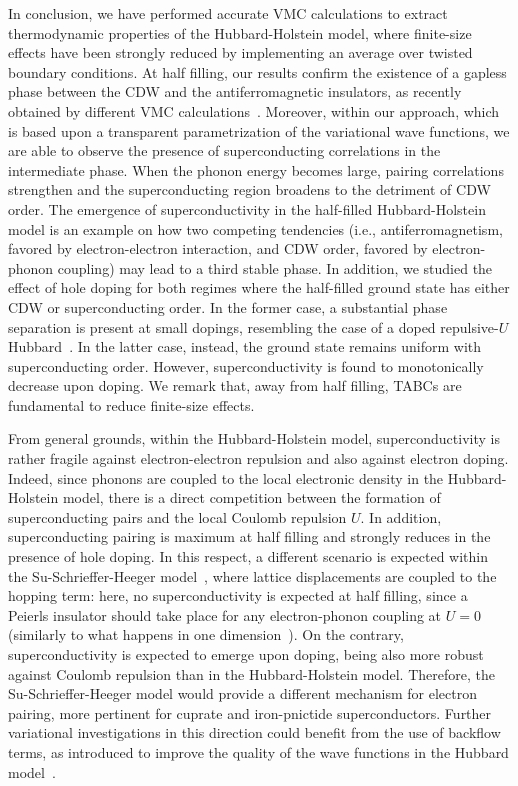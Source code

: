 \documentclass[aps,superscriptaddress,amsmath,amssymb,twocolumn,showpacs,floatfix,english]{revtex4}
\begin{document}
In conclusion, we have performed accurate VMC calculations to extract thermodynamic properties of the Hubbard-Holstein model, where 
finite-size effects have been strongly reduced by implementing an average over twisted boundary conditions. At half filling, our results 
confirm the existence of a gapless phase between the CDW and the antiferromagnetic insulators, as recently obtained by different VMC 
calculations~\cite{Ohgoe2017}. Moreover, within our approach, which is based upon a transparent parametrization of the variational wave 
functions, we are able to observe the presence of superconducting correlations in the intermediate phase. When the phonon energy becomes 
large, pairing correlations strengthen and the superconducting region broadens to the detriment of CDW order. The emergence of 
superconductivity in the half-filled Hubbard-Holstein model is an example on how two competing tendencies (i.e., antiferromagnetism, 
favored by electron-electron interaction, and CDW order, favored by electron-phonon coupling) may lead to a third stable phase. In addition, 
we studied the effect of hole doping for both regimes where the half-filled ground state has either CDW or superconducting order. In the 
former case, a substantial phase separation is present at small dopings, resembling the case of a doped repulsive-$U$ 
Hubbard~\cite{Macridin2006b,Aichhorn2007,Chang2008,Misawa2014,Sorella2015,Tocchio2016,Simkovic2017}. In the latter case, instead, the 
ground state remains uniform with superconducting order. However, superconductivity is found to monotonically decrease upon doping. 
We remark that, away from half filling, TABCs are fundamental to reduce finite-size effects.

From general grounds, within the Hubbard-Holstein model, superconductivity is rather fragile against electron-electron repulsion and also
against electron doping. Indeed, since phonons are coupled to the local electronic density in the Hubbard-Holstein model, there is a direct 
competition between the formation of superconducting pairs and the local Coulomb repulsion $U$. In addition, superconducting pairing
is maximum at half filling and strongly reduces in the presence of hole doping. In this respect, a different scenario is expected within the 
Su-Schrieffer-Heeger model~\cite{Su1979}, where lattice displacements are coupled to the hopping term: here, no superconductivity is 
expected at half filling, since a Peierls insulator should take place for any electron-phonon coupling at $U=0$ (similarly to what happens 
in one dimension~\cite{Fradkin1983,Baeriswyl1985,Weber2015}). On the contrary, superconductivity is expected to emerge upon doping, being 
also more robust against Coulomb repulsion than in the Hubbard-Holstein model. Therefore, the Su-Schrieffer-Heeger model would provide 
a different mechanism for electron pairing, more pertinent for cuprate and iron-pnictide superconductors. Further variational investigations 
in this direction could benefit from the use of backflow terms, as introduced to improve the quality of the wave functions 
in the Hubbard model~\cite{Tocchio2008,Tocchio2011}.
\end{document}
